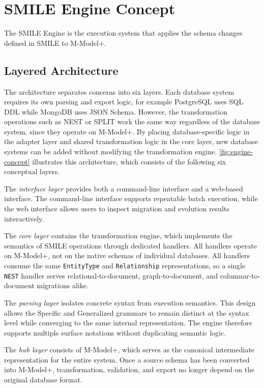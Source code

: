 \section{SMILE  Engine Concept}\label{sec:architecture}

  The SMILE  Engine is the execution system that applies the schema changes defined in SMILE  to M-Model+.

  \subsection{Layered Architecture}
  The architecture separates concerns into six layers. Each database system requires its own parsing and export logic, for
  example PostgreSQL uses SQL DDL while MongoDB uses JSON Schema. However, the transformation operations such as NEST or SPLIT work the same way
  regardless of the database system, since they operate on M-Model+. By placing database-specific logic in the adapter layer and shared
  transformation logic in the core layer, new database systems can be added without modifying the transformation engine.
  \autoref{fig:engine-concept} illustrates this architecture, which consists of the following six conceptual layers.

  The \emph{interface layer} provides both a command-line interface and a web-based interface. The command-line interface supports repeatable batch execution, while the web interface allows users to inspect migration and evolution results interactively.

  The \emph{core layer} contains the transformation engine, which implements the semantics of SMILE  operations through dedicated handlers. All handlers operate on M-Model+, not on the native schemas of individual databases. All handlers consume the same \texttt{EntityType} and \texttt{Relationship} representations, so a single \texttt{NEST} handler serves relational-to-document, graph-to-document, and columnar-to-document migrations alike.

  The \emph{parsing layer} isolates concrete syntax from execution semantics. This design allows the Specific and Generalized grammars to remain
  distinct at the syntax level while converging to the same internal representation. The engine therefore supports multiple surface notations without duplicating semantic logic.

  The \emph{hub layer} consists of M-Model+, which serves as the canonical intermediate representation for the entire system. Once a source schema
  has been converted into M-Model+, transformation, validation, and export no longer depend on the original database format.

